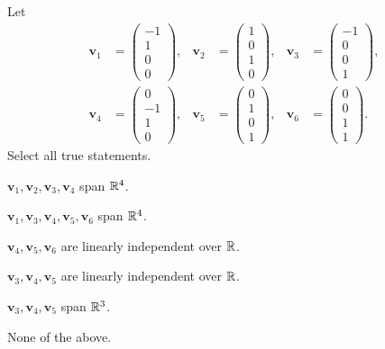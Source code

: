 \begin{problem}
Let
\[
\begin{aligned}
\mathbf v_1&=\begin{pmatrix}-1\\1\\0\\0\end{pmatrix},&
\mathbf v_2&=\begin{pmatrix}1\\0\\1\\0\end{pmatrix},&
\mathbf v_3&=\begin{pmatrix}-1\\0\\0\\1\end{pmatrix},\\[0.4em]
\mathbf v_4&=\begin{pmatrix}0\\-1\\1\\0\end{pmatrix},&
\mathbf v_5&=\begin{pmatrix}0\\1\\0\\1\end{pmatrix},&
\mathbf v_6&=\begin{pmatrix}0\\0\\1\\1\end{pmatrix}.
\end{aligned}
\]
Select all true statements.
\begin{problemchoices}
\item $\mathbf v_1,\mathbf v_2,\mathbf v_3,\mathbf v_4$ span $\mathbb{R}^4$.
\item $\mathbf v_1,\mathbf v_3,\mathbf v_4,\mathbf v_5,\mathbf v_6$ span $\mathbb{R}^4$.
\item $\mathbf v_4,\mathbf v_5,\mathbf v_6$ are linearly independent over $\mathbb{R}$.
\item $\mathbf v_3,\mathbf v_4,\mathbf v_5$ are linearly independent over $\mathbb{R}$.
\item $\mathbf v_3,\mathbf v_4,\mathbf v_5$ span $\mathbb{R}^3$.
\item None of the above.
\end{problemchoices}
\end{problem}

